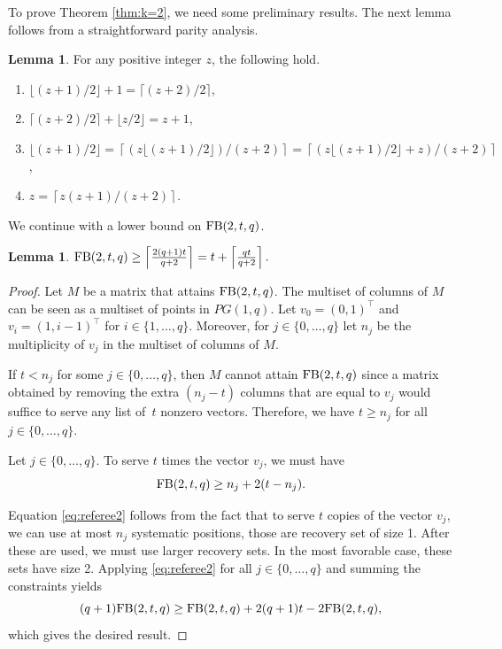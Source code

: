 \documentclass[11pt,a4paper]{article}
\theoremstyle{definition}
\newtheorem{lemma}[theorem]{Lemma}
\newcommand{\fb}{\textnormal{FB}}
\begin{document}
To prove Theorem \ref{thm:k=2}, we need some preliminary results. The next lemma follows from a straightforward parity analysis.
\begin{lemma}
\label{lemma:easyfacts}
For any positive integer $z$, the following hold.
\begin{enumerate}
    \item $\lfloor (z+1)/2 \rfloor +1 = \lceil (z+2)/2 \rceil$,
    \item $\lceil (z+2)/2 \rceil + \lfloor z/2 \rfloor = z+1$,
    \item $\lfloor (z+1)/2 \rfloor = \left \lceil (z \lfloor (z+1)/2 \rfloor)/(z+2) \right \rceil = \left \lceil (z \lfloor (z+1)/2 \rfloor+z)/(z+2) \right \rceil$,
    \item $z = \left \lceil z(z+1)/(z+2)\right \rceil$.
\end{enumerate}

\end{lemma}
We continue with a lower bound on $\fb(2,t,q)$.
\begin{lemma}
\label{lem:lower_bound_k=2}
$\fb(2,t,q) \ge \left\lceil \frac{2(q+1)t}{q+2} \right\rceil = t + \left\lceil \frac{qt}{q+2} \right\rceil.$
\end{lemma}
\begin{proof}
Let $M$ be a matrix that attains $\fb(2,t,q)$. The multiset of columns of $M$ can be seen as a multiset of points in $PG(1,q).$ Let $v_0 = (0,1)^\top$ and $v_i = (1,i-1)^\top$ for $i \in \{1,\ldots,q\}$. Moreover, for $j \in \{0,\ldots,q\}$ let $n_j$ be the multiplicity of $v_j$ in the multiset of columns of $M$. 

If $t < n_j$ for some $j \in \{0,\ldots,q\}$, then $M$ cannot attain $\fb(2,t,q)$ since a matrix obtained by removing the extra $(n_j-t)$ columns that are equal to $v_j$ would suffice to serve any list of~$t$ nonzero vectors.
Therefore, we have $t \ge n_j$ for all $j \in \{0,\ldots,q\}$.

Let $j \in \{0,\ldots,q\}.$ To serve $t$ times the vector $v_j$, we must have 
\begin{equation}
\label{eq:referee2}
\fb(2,t,q) \ge n_j + 2(t-n_j).
\end{equation}

Equation \eqref{eq:referee2} follows from the fact that to serve $t$ copies of the vector $v_j$, we can use at most $n_j$ systematic positions, those are recovery set of size 1. After these are used, we must use larger recovery sets. In the most favorable case, these sets have size 2. Applying \eqref{eq:referee2} for all $j \in \{0,\ldots,q\}$ and summing the constraints yields
$$(q+1)\fb(2,t,q) \ge \fb(2,t,q) + 2(q+1)t - 2\fb(2,t,q),$$ which gives the desired result.
\end{proof} 
\end{document}
